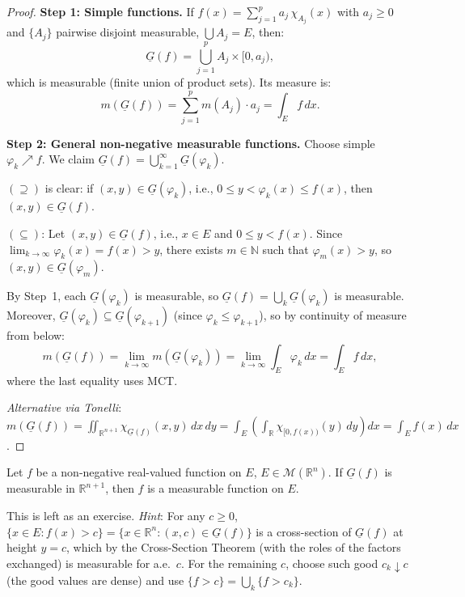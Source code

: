 \documentclass[11pt]{report}
\begin{document}
\begin{proof}
\textbf{Step 1: Simple functions.} If $f(x) = \sum_{j=1}^{p} a_j\,\chi_{A_j}(x)$ with $a_j \geq 0$ and $\{A_j\}$ pairwise disjoint measurable, $\bigcup A_j = E$, then:
\[
\underline{G}(f) = \bigcup_{j=1}^{p} A_j \times [0, a_j),
\]
which is measurable (finite union of product sets). Its measure is:
\[
m(\underline{G}(f)) = \sum_{j=1}^{p} m(A_j) \cdot a_j = \int_E f\,dx.
\]

\textbf{Step 2: General non-negative measurable functions.} Choose simple $\varphi_k \nearrow f$. We claim $\underline{G}(f) = \bigcup_{k=1}^{\infty} \underline{G}(\varphi_k)$.

$(\supseteq)$ is clear: if $(x, y) \in \underline{G}(\varphi_k)$, i.e., $0 \leq y < \varphi_k(x) \leq f(x)$, then $(x, y) \in \underline{G}(f)$.

$(\subseteq)$: Let $(x, y) \in \underline{G}(f)$, i.e., $x \in E$ and $0 \leq y < f(x)$. Since $\lim_{k \to \infty} \varphi_k(x) = f(x) > y$, there exists $m \in \mathbb{N}$ such that $\varphi_m(x) > y$, so $(x, y) \in \underline{G}(\varphi_m)$.

By Step~1, each $\underline{G}(\varphi_k)$ is measurable, so $\underline{G}(f) = \bigcup_k \underline{G}(\varphi_k)$ is measurable. Moreover, $\underline{G}(\varphi_k) \subseteq \underline{G}(\varphi_{k+1})$ (since $\varphi_k \leq \varphi_{k+1}$), so by continuity of measure from below:
\[
m(\underline{G}(f)) = \lim_{k \to \infty} m(\underline{G}(\varphi_k)) = \lim_{k \to \infty} \int_E \varphi_k\,dx = \int_E f\,dx,
\]
where the last equality uses MCT.

\textit{Alternative via Tonelli}: $m(\underline{G}(f)) = \iint_{\mathbb{R}^{n+1}} \chi_{\underline{G}(f)}(x, y)\,dx\,dy = \int_E \left(\int_{\mathbb{R}} \chi_{[0, f(x))}(y)\,dy\right) dx = \int_E f(x)\,dx$.
\end{proof}

\begin{thmbox}
Let $f$ be a non-negative real-valued function on $E$, $E \in \mathcal{M}(\mathbb{R}^n)$. If $\underline{G}(f)$ is measurable in $\mathbb{R}^{n+1}$, then $f$ is a measurable function on $E$.
\end{thmbox}

\begin{rembox}
This is left as an exercise. \textit{Hint}: For any $c \geq 0$, $\{x \in E : f(x) > c\} = \{x \in \mathbb{R}^n : (x, c) \in \underline{G}(f)\}$ is a cross-section of $\underline{G}(f)$ at height $y = c$, which by the Cross-Section Theorem (with the roles of the factors exchanged) is measurable for a.e.\ $c$. For the remaining $c$, choose such good $c_k \downarrow c$ (the good values are dense) and use $\{f > c\} = \bigcup_k \{f > c_k\}$.
\end{rembox}
\end{document}
